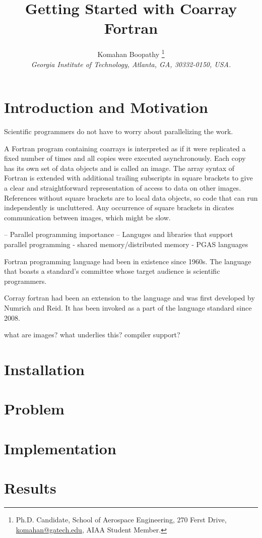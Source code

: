 \documentclass[journal]{aiaa-pretty} %
\title{Getting Started with Coarray Fortran}
\author{Komahan Boopathy \thanks{Ph.D. Candidate, School of Aerospace
    Engineering, 270 Ferst Drive, \url{komahan@gatech.edu}, AIAA
    Student Member.} \\
  {\normalsize\itshape Georgia Institute of Technology,
    Atlanta, GA, 30332-0150, USA.}\\
}
\begin{document}

\maketitle

\section{Introduction and Motivation}

Scientific programmers do not have to worry about parallelizing the
work.

A Fortran program containing coarrays is interpreted as if it were
replicated a fixed number of times and all copies were executed
asynchronously. Each copy has its own set of data objects and is
called an image. The array syntax of Fortran is extended with
additional trailing subscripts in square brackets to give a clear and
straightforward representation of access to data on other images.
References without square brackets are to local data objects, so code
that can run independently is uncluttered. Any occurrence of square
brackets in dicates communication between images, which might be slow.

-- Parallel programming importance
-- Languges and libraries that support parallel programming
   - shared memory/distributed memory
   - PGAS languages

Fortran programming language had been in existence since 1960s. The
language that boasts a standard's committee whose target audience is
scientific programmers.

Corray fortran had been an extension to the language and was first
developed by Numrich and Reid. It has been invoked as a part of the
language standard since 2008.

what are images?
what underlies this?
compiler support?

\section{Installation}

\section{Problem}

\section{Implementation}

\section{Results}



\end{document}
